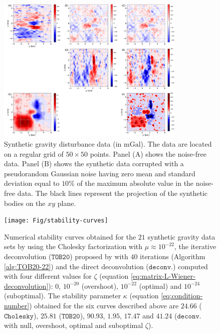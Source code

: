 
\begin{figure}[htbp]
	\begin{center}
			\includegraphics[width=9cm]{Fig/noise-free-data}
		\end{center}
	\caption{
		Synthetic gravity disturbance data (in $\mathrm{mGal}$). 
		The data are located on a regular grid of $50 \times 50$ points. 
		Panel (A) shows the noise-free data. Panel (B) shows the synthetic data corrupted 
		with a pseudorandom Gaussian noise having zero mean and standard deviation equal to $10\%$
		of the maximum absolute value in the noise-free data.
		The black lines represent the projection of the synthetic bodies on the $xy$ plane.
		}
	\label{fig:noise-free-data}
\end{figure}

\begin{figure}[htbp]
	\begin{center}
		\texttt{[image: Fig/stability-curves]}
	\end{center}
	\caption{
		Numerical stability curves obtained for the $21$ synthetic gravity data sets 
		by using the Cholesky factorization with $\mu \approx 10^{-22}$, the iterative deconvolution
		($\mathtt{TOB20}$) proposed by \citet{takahashi-etal2020} with $40$ iterations (Algorithm \ref{alg:TOB20-22}) 
		and the direct deconvolution ($\mathtt{deconv.}$) computed with four different values for $\zeta$ 
		(equation \ref{eq:matrix-L-Wiener-deconvolution}): $0$, $10^{-20}$ (overshoot), $10^{-22}$ (optimal)
		and $10^{-24}$ (suboptimal).
		The stability parameter $\kappa$ (equation \ref{eq:condition-number}) obtained for the six curves
		described above are $24.66$ ($\mathtt{Cholesky}$), $25.81$ ($\mathtt{TOB20}$), $90.93$, $1.95$, $17.47$ and $41.24$ ($\mathtt{deconv.}$ with null, overshoot, optimal and suboptimal $\zeta$).
		}
	\label{fig:stability-curves}
\end{figure}

